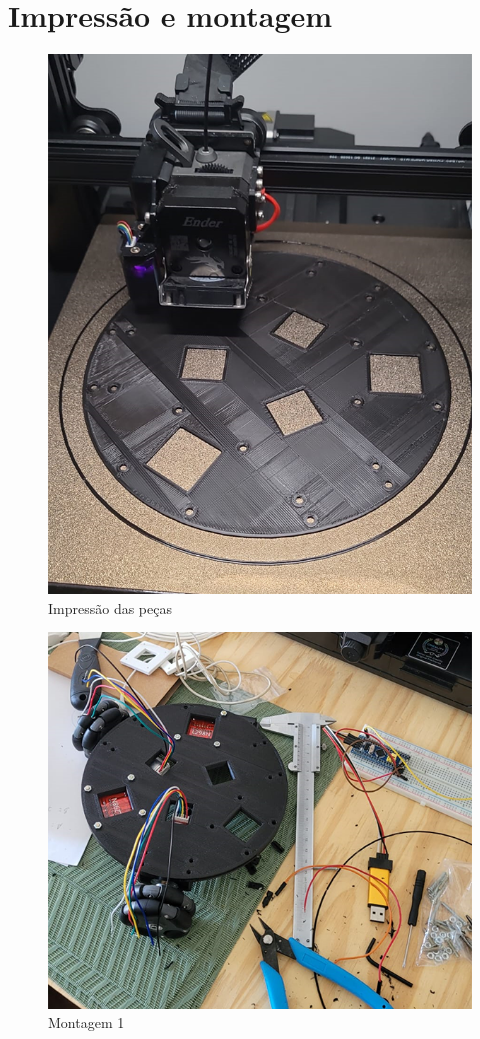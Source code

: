 \chapter{Impressão e montagem}
\label{att_fabricao_montagem_impressao}

\begin{figure}[h]
	\centering
	\includegraphics{figures/impressao}
	\caption{Impressão das peças}
	\label{fig:impressao}
\end{figure}

\begin{figure}[h]
	\centering
	\includegraphics{figures/montagem_1}
	\caption{Montagem 1}
	\label{fig:montagem}
\end{figure}

